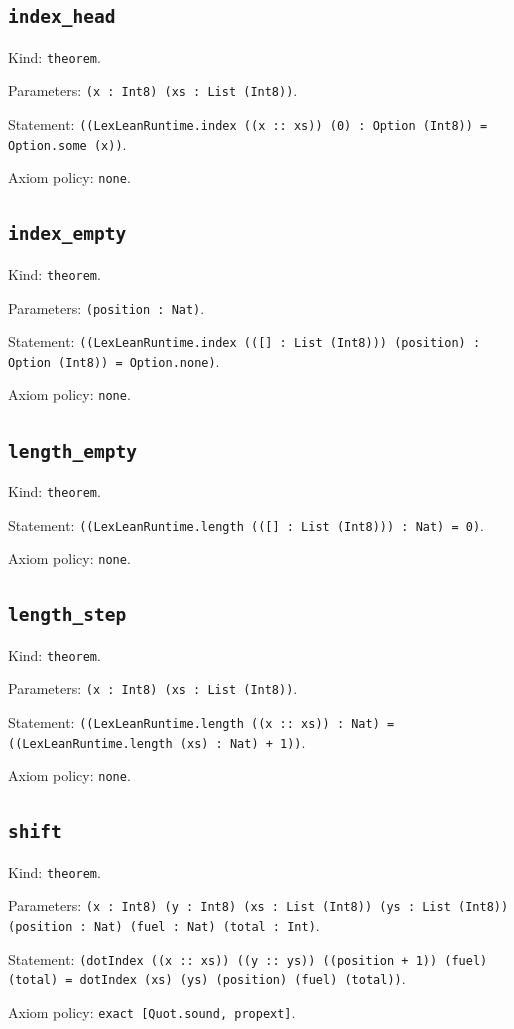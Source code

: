 \documentclass[11pt]{article}
\begin{document}
\subsection*{\texttt{index\_head}}
\noindent Kind: \texttt{theorem}.\par
\noindent Parameters: \texttt{(x : Int8) (xs : List (Int8))}.\par
\noindent Statement: \texttt{((LexLeanRuntime.index ((x :: xs)) (0) : Option (Int8)) = Option.some (x))}.\par
\noindent Axiom policy: \texttt{none}.\par
\subsection*{\texttt{index\_empty}}
\noindent Kind: \texttt{theorem}.\par
\noindent Parameters: \texttt{(position : Nat)}.\par
\noindent Statement: \texttt{((LexLeanRuntime.index (([] : List (Int8))) (position) : Option (Int8)) = Option.none)}.\par
\noindent Axiom policy: \texttt{none}.\par
\subsection*{\texttt{length\_empty}}
\noindent Kind: \texttt{theorem}.\par
\noindent Statement: \texttt{((LexLeanRuntime.length (([] : List (Int8))) : Nat) = 0)}.\par
\noindent Axiom policy: \texttt{none}.\par
\subsection*{\texttt{length\_step}}
\noindent Kind: \texttt{theorem}.\par
\noindent Parameters: \texttt{(x : Int8) (xs : List (Int8))}.\par
\noindent Statement: \texttt{((LexLeanRuntime.length ((x :: xs)) : Nat) = ((LexLeanRuntime.length (xs) : Nat) + 1))}.\par
\noindent Axiom policy: \texttt{none}.\par
\subsection*{\texttt{shift}}
\noindent Kind: \texttt{theorem}.\par
\noindent Parameters: \texttt{(x : Int8) (y : Int8) (xs : List (Int8)) (ys : List (Int8)) (position : Nat) (fuel : Nat) (total : Int)}.\par
\noindent Statement: \texttt{(dotIndex ((x :: xs)) ((y :: ys)) ((position + 1)) (fuel) (total) = dotIndex (xs) (ys) (position) (fuel) (total))}.\par
\noindent Axiom policy: \texttt{exact [Quot.sound, propext]}.\par
\end{document}
